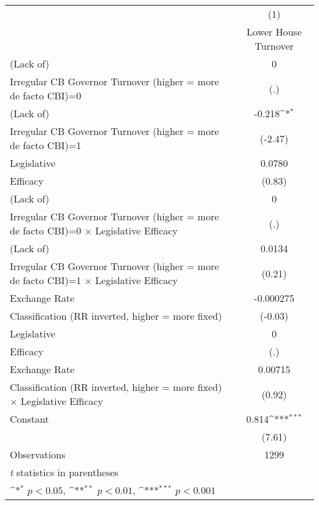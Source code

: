 {
\def\sym#1{\ifmmode^{#1}\else\(^{#1}\)\fi}
\begin{tabular}{l*{1}{c}}
\toprule
                &\multicolumn{1}{c}{(1)}\\
                &\multicolumn{1}{c}{Lower House Turnover}\\
\midrule
(Lack of)       &        0         \\
Irregular CB Governor Turnover (higher = more de facto CBI)=0&      (.)         \\
\addlinespace
(Lack of)       &   -0.218\sym{*}  \\
Irregular CB Governor Turnover (higher = more de facto CBI)=1&  (-2.47)         \\
\addlinespace
Legislative     &   0.0780         \\
Efficacy        &   (0.83)         \\
\addlinespace
(Lack of)       &        0         \\
Irregular CB Governor Turnover (higher = more de facto CBI)=0 $\times$ Legislative Efficacy&      (.)         \\
\addlinespace
(Lack of)       &   0.0134         \\
Irregular CB Governor Turnover (higher = more de facto CBI)=1 $\times$ Legislative Efficacy&   (0.21)         \\
\addlinespace
Exchange Rate   &-0.000275         \\
Classification (RR inverted, higher = more fixed)&  (-0.03)         \\
\addlinespace
Legislative     &        0         \\
Efficacy        &      (.)         \\
\addlinespace
Exchange Rate   &  0.00715         \\
Classification (RR inverted, higher = more fixed) $\times$ Legislative Efficacy&   (0.92)         \\
\addlinespace
Constant        &    0.814\sym{***}\\
                &   (7.61)         \\
\midrule
Observations    &     1299         \\
\bottomrule
\multicolumn{2}{l}{\footnotesize \textit{t} statistics in parentheses}\\
\multicolumn{2}{l}{\footnotesize \sym{*} \(p<0.05\), \sym{**} \(p<0.01\), \sym{***} \(p<0.001\)}\\
\end{tabular}
}

